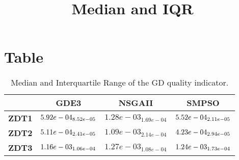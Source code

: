 \documentclass{article}
\title{Median and IQR}
\author{}
\begin{document}
\maketitle
\section{Table}
\begin{table}[!htp]
  \caption{Median and Interquartile Range of the GD quality indicator.}
  \label{table:GD}
  \centering
  \begin{scriptsize}
  \begin{tabular}{c|ccc}
      & \textbf{GDE3} & \textbf{NSGAII} & \textbf{SMPSO} \\\hline
      \textbf{ZDT1} & $\cellcolor{gray25} 5.92e-04_{8.52e-05} $ & $ 1.28e-03_{1.69e-04} $ & $ \cellcolor{gray95} 5.52e-04_{2.11e-05}$ \\
      \textbf{ZDT2} & $\cellcolor{gray25} 5.11e-04_{2.41e-05} $ & $ 1.09e-03_{2.14e-04} $ & $ \cellcolor{gray95} 4.23e-04_{2.94e-05}$ \\
      \textbf{ZDT3} & $\cellcolor{gray95} 1.16e-03_{1.06e-04} $ & $ 1.27e-03_{1.08e-04} $ & $ \cellcolor{gray25} 1.24e-03_{1.73e-04}$ \\
  \end{tabular}
  \end{scriptsize}
\end{table}
\end{document}
